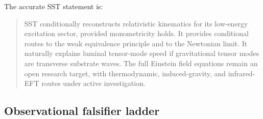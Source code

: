 The accurate SST statement is:

\begin{quote}
SST conditionally reconstructs relativistic kinematics for its low-energy
excitation sector, provided monometricity holds. It provides conditional routes
to the weak equivalence principle and to the Newtonian limit. It naturally
explains luminal tensor-mode speed if gravitational tensor modes are transverse
substrate waves. The full Einstein field equations remain an open research
target, with thermodynamic, induced-gravity, and infrared-EFT routes under
active investigation.
\end{quote}

\subsection{Observational falsifier ladder}

